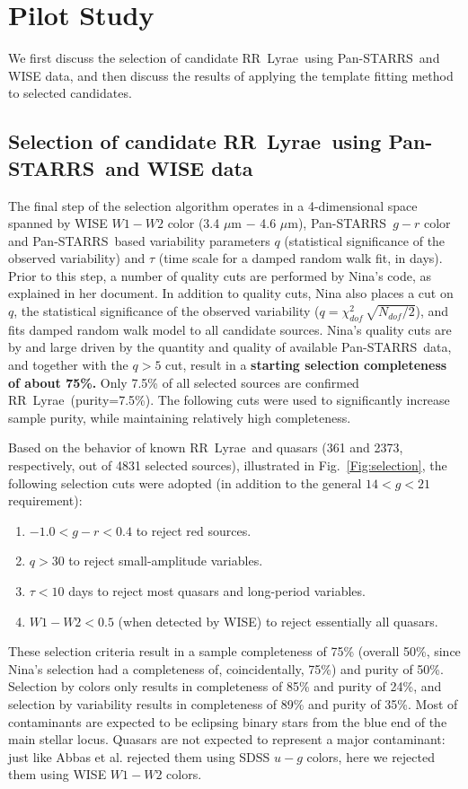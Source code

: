 \documentclass[12pt, preprint]{aastex}
\def\PS  {\hbox{Pan-STARRS}}
\def\RR  {\hbox{RR Lyrae}}
\begin{document}
\section{Pilot Study} 


We first discuss the selection of candidate \RR\ using \PS\ and WISE data, and then 
discuss the results of applying the template fitting method to selected candidates. 


\subsection{Selection of candidate \RR\ using \PS\ and WISE data} 

The final step of the selection algorithm operates in a 4-dimensional space spanned
by WISE $W1-W2$ color (3.4 $\mu$m $-$ 4.6 $\mu$m), \PS\ $g-r$ color and \PS\ 
based variability parameters $q$ (statistical significance of the observed variability)
and $\tau$ (time scale for a damped random walk fit, in days). Prior to this step, a 
number of quality cuts are performed by Nina's code, as explained in her document.
In addition to quality cuts, Nina also places a cut on $q$, the statistical significance 
of the observed variability ($q=\chi^2_{dof} \, \sqrt{N_{dof}/2}$), and fits damped random 
walk model to all candidate sources. Nina's quality cuts are by and large driven by the 
quantity and quality of available \PS\ data, and together with the $q>5$ cut, result in a
 {\bf starting selection completeness of about 75\%.}  Only 7.5\% of all selected
sources are confirmed \RR\ (purity=7.5\%). The following cuts were used to significantly 
increase sample purity, while maintaining relatively high completeness. 

Based on the behavior of known \RR\ and quasars (361 and 2373, respectively, 
out of 4831 selected sources), illustrated in Fig.~\ref{Fig:selection}, the following 
selection cuts were adopted (in addition to the general $14 < g < 21$ requirement): 
\begin{enumerate}
\item $-1.0<g-r<0.4$ to reject red sources. 
\item $q>30$ to reject small-amplitude variables.
\item $\tau < 10$ days to reject most quasars and long-period variables.
\item $W1-W2 < 0.5$ (when detected by WISE)  to reject essentially all quasars. 
\end{enumerate} 

These selection criteria result in a sample completeness of 75\% (overall 50\%, since
Nina's selection had a completeness of, coincidentally, 75\%) and purity of 50\%. 
Selection by colors only results in completeness of 85\% and purity of 24\%,
and selection by variability results in completeness of 89\% and purity of 35\%.
Most of contaminants are expected to be eclipsing binary stars from the blue
end of the main stellar locus. Quasars are not expected to represent a major
contaminant: just like Abbas et al. rejected them using SDSS $u-g$ colors,
here we rejected them using WISE $W1-W2$ colors. 
\end{document}
